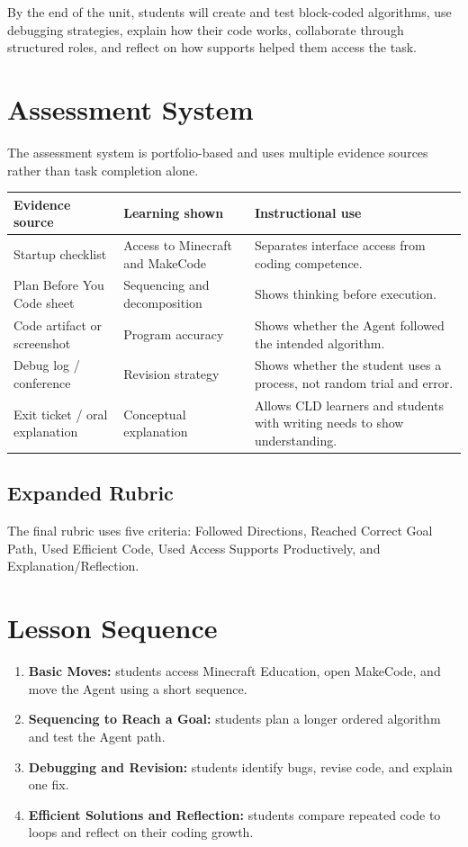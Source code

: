 \documentclass[12pt]{article}
\begin{document}
By the end of the unit, students will create and test block-coded algorithms, use debugging strategies, explain how their code works, collaborate through structured roles, and reflect on how supports helped them access the task.

\section{Assessment System}
The assessment system is portfolio-based and uses multiple evidence sources rather than task completion alone.

\begin{longtable}{@{}P{1.7in}P{2in}P{3in}@{}}
\toprule
\textbf{Evidence source} & \textbf{Learning shown} & \textbf{Instructional use} \\
\midrule
Startup checklist & Access to Minecraft and MakeCode & Separates interface access from coding competence. \\
Plan Before You Code sheet & Sequencing and decomposition & Shows thinking before execution. \\
Code artifact or screenshot & Program accuracy & Shows whether the Agent followed the intended algorithm. \\
Debug log / conference & Revision strategy & Shows whether the student uses a process, not random trial and error. \\
Exit ticket / oral explanation & Conceptual explanation & Allows CLD learners and students with writing needs to show understanding. \\
\bottomrule
\end{longtable}

\subsection{Expanded Rubric}
The final rubric uses five criteria: Followed Directions, Reached Correct Goal Path, Used Efficient Code, Used Access Supports Productively, and Explanation/Reflection.

\section{Lesson Sequence}
\begin{enumerate}
\item \textbf{Basic Moves:} students access Minecraft Education, open MakeCode, and move the Agent using a short sequence.
\item \textbf{Sequencing to Reach a Goal:} students plan a longer ordered algorithm and test the Agent path.
\item \textbf{Debugging and Revision:} students identify bugs, revise code, and explain one fix.
\item \textbf{Efficient Solutions and Reflection:} students compare repeated code to loops and reflect on their coding growth.
\end{enumerate}
\end{document}
